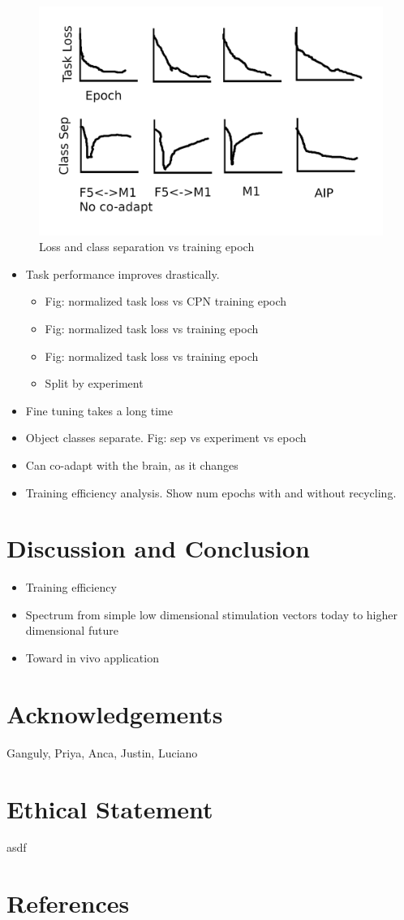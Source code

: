 \documentclass[12pt]{iopart}
\begin{document}
\begin{figure}[h]
\includegraphics[width=\textwidth]{results_standin.png}
\caption{Loss and class separation vs training epoch}
\centering
\label{fig:results}
\end{figure}

\begin{itemize}
	\item Task performance improves drastically.
		\begin{itemize}
			\item Fig: normalized task loss vs CPN training epoch
			\item Fig: normalized task loss vs training epoch
			\item Fig: normalized task loss vs training epoch
			\item Split by experiment
		\end{itemize}
	\item Fine tuning takes a long time
	\item Object classes separate. Fig: sep vs experiment vs epoch
	\item Can co-adapt with the brain, as it changes
	\item Training efficiency analysis. Show num epochs with and without recycling.
\end{itemize}

\section{Discussion and Conclusion}
\begin{itemize}
	\item Training efficiency
	\item Spectrum from simple low dimensional stimulation vectors today to higher dimensional future
	\item Toward in vivo application
\end{itemize}

\section{Acknowledgements}
Ganguly, Priya, Anca, Justin, Luciano

\section{Ethical Statement}
asdf

\section{References}


\end{document}
